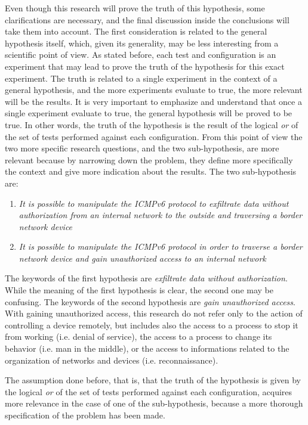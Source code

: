 \documentclass[12pt]{article}
\begin{document}
Even though this research will prove the truth of this hypothesis, some clarifications are necessary, and the final discussion inside the conclusions will take them into account. The first consideration is related to the general hypothesis itself, which, given its generality, may be less interesting from a scientific point of view. As stated before, each test and configuration is an experiment that may lead to prove the truth of the hypothesis for this exact experiment. The truth is related to a single experiment in the context of a general hypothesis, and the more experiments evaluate to true, the more relevant will be the results. It is very important to emphasize and understand that once a single experiment evaluate to true, the general hypothesis will be proved to be true. In other words, the truth of the hypothesis is the result of the logical \textit{or} of the set of tests performed against each configuration. From this point of view the two more specific research questions, and the two sub-hypothesis, are more relevant because by narrowing down the problem, they define more specifically the context and give more indication about the results. The two sub-hypothesis are:
\begin{enumerate}[ref=hypothesis \arabic*]
 \item \label{firstHyp} \textit{It is possible to manipulate the ICMPv6 protocol to exfiltrate data without authorization from an internal network to the outside and traversing a border network device}
 \item \label{secondHyp}\textit{It is possible to manipulate the ICMPv6 protocol in order to traverse a border network device and gain unauthorized access to an internal network}
\end{enumerate}

The keywords of the first hypothesis are \textit{exfiltrate data without authorization}. While the meaning of the first hypothesis is clear, the second one may be confusing. The keywords of the second hypothesis are \textit{gain unauthorized access}. With gaining unauthorized access, this research do not refer only to the action of controlling a device remotely, but includes also the access to a process to stop it from working (i.e. denial of service), the access to a process to change its behavior (i.e. man in the middle), or the access to informations related to the organization of networks and devices (i.e. reconnaissance).

The assumption done before, that is, that the truth of the hypothesis is given by the logical \textit{or} of the set of tests performed against each configuration, acquires more relevance in the case of one of the sub-hypothesis, because a more thorough specification of the problem has been made.
\end{document}

